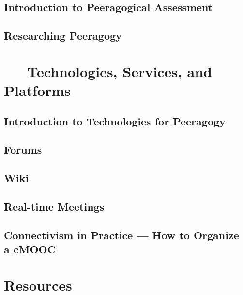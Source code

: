 \documentclass[ebook, 12pt, twoside]{memoir}
\begin{document}
\chapter[\textbf{Peeragogical Assessment}]{Introduction to Peeragogical Assessment}

%
\chapter[\textbf{Researching Peeragogy}]{Researching Peeragogy}
%



\part{~~~Technologies, Services, and Platforms } \label{technologies-part} %
%
\chapter[\textbf{Peeragogy Technology}]{Introduction to Technologies for Peeragogy}

%
\chapter[\textbf{Forums}]{ Forums } 
%

%
\chapter[\textbf{Wiki}]{ Wiki } 
%

%
\chapter[\textbf{Real-time Meetings}]{ Real-time Meetings } 
%

%
\chapter[\textbf{How to Organize a MOOC}]{ Connectivism in Practice ---  How to Organize a cMOOC}
%



\part{Resources} \label{resources-part} %
%
%
\end{document}
